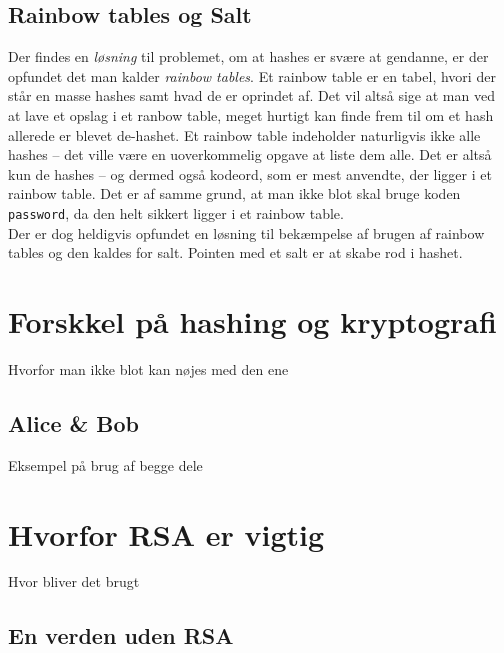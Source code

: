 \documentclass[a4paper, 12pt]{article}
\theoremstyle{break}
\theoremstyle{breakline}
\theoremstyle{beviser}
\begin{document}
    \subsection{Rainbow tables og Salt}
    Der findes en \textit{løsning} til problemet, om at hashes er svære at gendanne, er der opfundet det man kalder \emph{rainbow tables}.
    Et rainbow table er en tabel, hvori der står en masse hashes samt hvad de er oprindet af.
    Det vil altså sige at man ved at lave et opslag i et ranbow table, meget hurtigt kan finde frem til om et hash allerede er blevet de-hashet.
    Et rainbow table indeholder naturligvis ikke alle hashes -- det ville være en uoverkommelig opgave at liste dem alle.
    Det er altså kun de hashes -- og dermed også kodeord, som er mest anvendte, der ligger i et rainbow table.
    Det er af samme grund, at man ikke blot skal bruge koden \texttt{password}, da den helt sikkert ligger i et rainbow table.
    \\

    Der er dog heldigvis opfundet en løsning til bekæmpelse af brugen af rainbow tables og den kaldes for salt.
    Pointen med et salt er at skabe rod i hashet.







\newpage
\section{Forskkel på hashing og kryptografi}
Hvorfor man ikke blot kan nøjes med den ene

    \subsection{Alice \& Bob}
    Eksempel på brug af begge dele



\newpage
\section{Hvorfor RSA er vigtig}
Hvor bliver det brugt

    \subsection{En verden uden RSA}





\newpage
\nocite{*}
\setlength\bibitemsep{10pt}
\printbibliography[
heading=bibintoc, %
title={Litteratur} %
]
\end{document}
